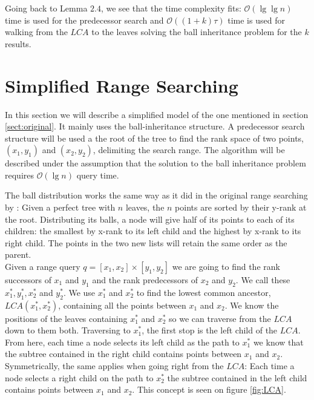 Going back to Lemma $2.4$, we see that the time complexity fits: $\mathcal{O}(\lg \lg n)$ time is used for the predecessor search and $\mathcal{O}((1+k)\tau)$ time is used for walking from the $LCA$ to the leaves solving the ball inheritance problem for the $k$ results.

\section{Simplified Range Searching}

In this section we will describe a simplified model of the one mentioned in section \ref{sect:original}. It mainly uses the ball-inheritance structure. A predecessor search structure will be used a the root of the tree to find the rank space of two points, $(x_1,y_1)$ and $(x_2,y_2)$, delimiting the search range. The algorithm will be described under the assumption that the solution to the ball inheritance problem requires $\mathcal{O}(\lg n)$ query time.

The ball distribution works the same way as it did in the original range searching by \citeauthor{chanetal}: Given a perfect tree with $n$ leaves, the $n$ points are sorted by their y-rank at the root. Distributing its balls, a node will give half of its points to each of its children: the smallest by x-rank to its left child and the highest by x-rank to its right child. The points in the two new lists will retain the same order as the parent. \\

Given a range query $q = [x_1, x_2] \times [y_1, y_2]$ we are going to find the rank successors of $x_1$ and $y_1$ and the rank predecessors of $x_2$ and $y_2$.  We call these $x^*_1, y^*_1, x^*_2$ and $y^*_2$. We use $x^*_1$ and $x^*_2$ to find the lowest common ancestor, $LCA(x^*_1, x^*_2)$, containing all the points between $x_1$ and $x_2$. We know the positions of the leaves containing $x^*_1$ and $x^*_2$ so we can traverse from the $LCA$ down to them both. Traversing to $x^*_1$, the first stop is the left child of the $LCA$. From here, each time a node selects its left child as the path to $x^*_1$ we know that the subtree contained in the right child contains points between $x_1$ and $x_2$. Symmetrically, the same applies when going right from the $LCA$: Each time a node selects a right child on the path to $x^*_2$ the subtree contained in the left child contains points between $x_1$ and $x_2$. This concept is seen on figure \ref{fig:LCA}. \\

